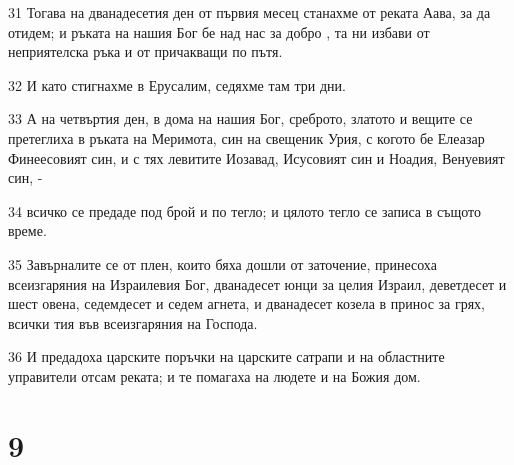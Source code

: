 \par 31 Тогава на дванадесетия ден от първия месец станахме от реката Аава, за да отидем; и ръката на нашия Бог бе над нас за добро , та ни избави от неприятелска ръка и от причакващи по пътя.
\par 32 И като стигнахме в Ерусалим, седяхме там три дни.
\par 33 А на четвъртия ден, в дома на нашия Бог, среброто, златото и вещите се претеглиха в ръката на Меримота, син на свещеник Урия, с когото бе Елеазар Финеесовият син, и с тях левитите Иозавад, Исусовият син и Ноадия, Венуевият син, -
\par 34 всичко се предаде под брой и по тегло; и цялото тегло се записа в същото време.
\par 35 Завърналите се от плен, които бяха дошли от заточение, принесоха всеизгаряния на Израилевия Бог, дванадесет юнци за целия Израил, деветдесет и шест овена, седемдесет и седем агнета, и дванадесет козела в принос за грях, всички тия във всеизгаряния на Господа.
\par 36 И предадоха царските поръчки на царските сатрапи и на областните управители отсам реката; и те помагаха на людете и на Божия дом.

\chapter{9}

